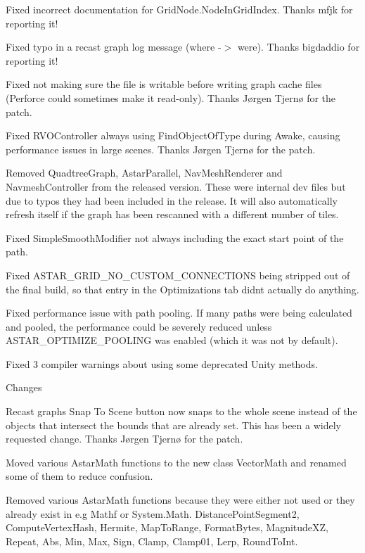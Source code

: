 \begin{DoxyItemize}
\begin{DoxyItemize}
\begin{DoxyItemize}
\item Fixed incorrect documentation for Grid\+Node.\+Node\+In\+Grid\+Index. Thanks mfjk for reporting it!
\item Fixed typo in a recast graph log message (where -\/$>$ were). Thanks bigdaddio for reporting it!
\item Fixed not making sure the file is writable before writing graph cache files (Perforce could sometimes make it read-\/only). Thanks Jørgen Tjernø for the patch.
\item Fixed R\+V\+O\+Controller always using Find\+Object\+Of\+Type during Awake, causing performance issues in large scenes. Thanks Jørgen Tjernø for the patch.
\item Removed Quadtree\+Graph, Astar\+Parallel, Nav\+Mesh\+Renderer and Navmesh\+Controller from the released version. These were internal dev files but due to typos they had been included in the release. It will also automatically refresh itself if the graph has been rescanned with a different number of tiles.
\item Fixed Simple\+Smooth\+Modifier not always including the exact start point of the path.
\item Fixed A\+S\+T\+A\+R\+\_\+\+G\+R\+I\+D\+\_\+\+N\+O\+\_\+\+C\+U\+S\+T\+O\+M\+\_\+\+C\+O\+N\+N\+E\+C\+T\+I\+O\+NS being stripped out of the final build, so that entry in the Optimizations tab didn\textquotesingle{}t actually do anything.
\item Fixed performance issue with path pooling. If many paths were being calculated and pooled, the performance could be severely reduced unless A\+S\+T\+A\+R\+\_\+\+O\+P\+T\+I\+M\+I\+Z\+E\+\_\+\+P\+O\+O\+L\+I\+NG was enabled (which it was not by default).
\item Fixed 3 compiler warnings about using some deprecated Unity methods.
\end{DoxyItemize}
\item Changes
\begin{DoxyItemize}
\item Recast graphs\textquotesingle{} \textquotesingle{}Snap To Scene\textquotesingle{} button now snaps to the whole scene instead of the objects that intersect the bounds that are already set. This has been a widely requested change. Thanks Jørgen Tjernø for the patch.
\item Moved various Astar\+Math functions to the new class Vector\+Math and renamed some of them to reduce confusion.
\item Removed various Astar\+Math functions because they were either not used or they already exist in e.\+g Mathf or System.\+Math. Distance\+Point\+Segment2, Compute\+Vertex\+Hash, Hermite, Map\+To\+Range, Format\+Bytes, Magnitude\+XZ, Repeat, Abs, Min, Max, Sign, Clamp, Clamp01, Lerp, Round\+To\+Int.

\end{DoxyItemize}
\end{DoxyItemize}
\end{DoxyItemize}
